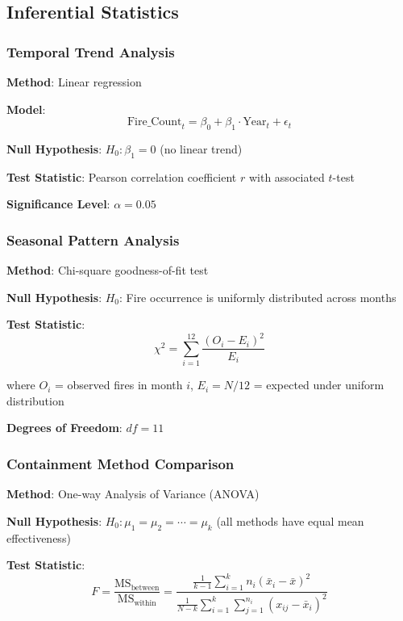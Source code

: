 \documentclass[12pt,a4paper]{article}
\begin{document}
\subsection{Inferential Statistics}

\subsubsection{Temporal Trend Analysis}

\textbf{Method}: Linear regression

\textbf{Model}:
\begin{equation}
\text{Fire\_Count}_t = \beta_0 + \beta_1 \cdot \text{Year}_t + \epsilon_t
\end{equation}

\textbf{Null Hypothesis}: $H_0: \beta_1 = 0$ (no linear trend)

\textbf{Test Statistic}: Pearson correlation coefficient $r$ with associated $t$-test

\textbf{Significance Level}: $\alpha = 0.05$

\subsubsection{Seasonal Pattern Analysis}

\textbf{Method}: Chi-square goodness-of-fit test

\textbf{Null Hypothesis}: $H_0$: Fire occurrence is uniformly distributed across months

\textbf{Test Statistic}:
\begin{equation}
\chi^2 = \sum_{i=1}^{12} \frac{(O_i - E_i)^2}{E_i}
\end{equation}

where $O_i$ = observed fires in month $i$, $E_i = N/12$ = expected under uniform distribution

\textbf{Degrees of Freedom}: $df = 11$

\subsubsection{Containment Method Comparison}

\textbf{Method}: One-way Analysis of Variance (ANOVA)

\textbf{Null Hypothesis}: $H_0: \mu_1 = \mu_2 = \cdots = \mu_k$ (all methods have equal mean effectiveness)

\textbf{Test Statistic}:
\begin{equation}
F = \frac{\text{MS}_{\text{between}}}{\text{MS}_{\text{within}}} = \frac{\frac{1}{k-1}\sum_{i=1}^{k}n_i(\bar{x}_i - \bar{x})^2}{\frac{1}{N-k}\sum_{i=1}^{k}\sum_{j=1}^{n_i}(x_{ij} - \bar{x}_i)^2}
\end{equation}
\end{document}
